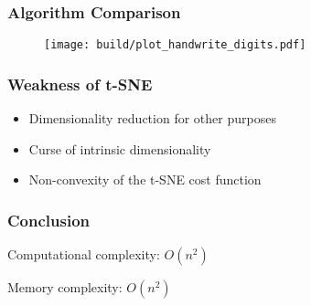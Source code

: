 \documentclass{beamer}
\begin{document}
% 
% 
% 
% 
% 
%
\begin{frame}
  \frametitle{Algorithm Comparison}
  \begin{figure}
    \centering
    \texttt{[image: build/plot\_handwrite\_digits.pdf]}
  \end{figure}
  \end{frame}

% 
% 
% 
% 
% 
%
\begin{frame}
  \frametitle{Weakness of t-SNE}
  
  \begin{itemize}
    \item Dimensionality reduction for other purposes
    \item Curse of intrinsic dimensionality
    \item Non-convexity of the t-SNE cost function
  \end{itemize}
    
\end{frame}
% 
% 
% 
% 
% 
%
\begin{frame}
  \frametitle{Conclusion}

  Computational complexity: $O(n^2)$

  Memory complexity: $O(n^2)$
    
\end{frame}
\end{document}
